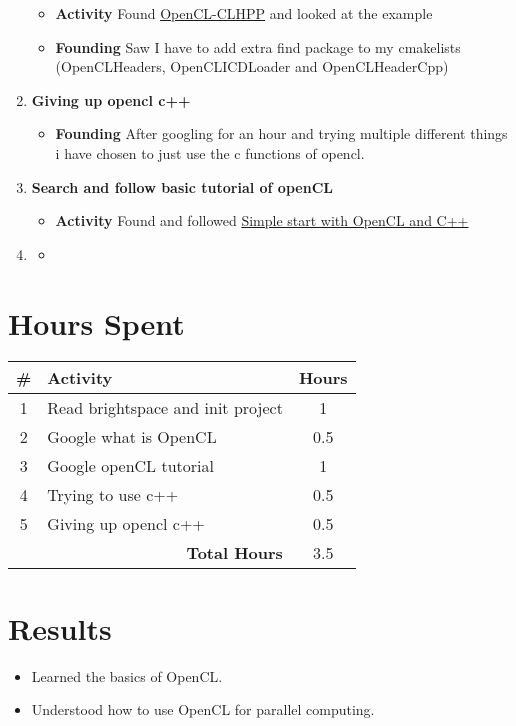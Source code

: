\documentclass{article}
\begin{document}
\begin{enumerate}
    \begin{itemize}
        \item \textbf{Activity} Found \href{https://github.com/KhronosGroup/OpenCL-CLHPP}{OpenCL-CLHPP} and looked at the example
        \item \textbf{Founding} Saw I have to add extra find package to my cmakelists (OpenCLHeaders, OpenCLICDLoader and OpenCLHeaderCpp)
    \end{itemize}
    \item \textbf{Giving up opencl c++}
    \begin{itemize}
        \item \textbf{Founding} After googling for an hour and trying multiple different things i have chosen to just use the c functions of opencl.
    \end{itemize}
    \item \textbf{Search and follow basic tutorial of openCL}
    \begin{itemize}
        \item \textbf{Activity} Found and followed \href{https://programmerclick.com/article/47811146604/}{Simple start with OpenCL and C++}
    \end{itemize}
    \item \textbf{}
    \begin{itemize}
        \item \textbf{}
    \end{itemize}
\end{enumerate}

\section*{Hours Spent}
\begin{tabular}{|c|l|c|}
    \hline
    \# & Activity & Hours \\
    \hline
    1 & Read brightspace and init project & 1 \\
    2 & Google what is OpenCL & 0.5 \\
    3 & Google openCL tutorial & 1 \\
    4 & Trying to use c++ & 0.5 \\
    5 & Giving up opencl c++ & 0.5 \\
    \hline
    \multicolumn{2}{|r|}{\textbf{Total Hours}} & 3.5 \\
    \hline
\end{tabular}

\section*{Results}
\begin{itemize}
    \item Learned the basics of OpenCL.
    \item Understood how to use OpenCL for parallel computing.
\end{itemize}
\end{document}
